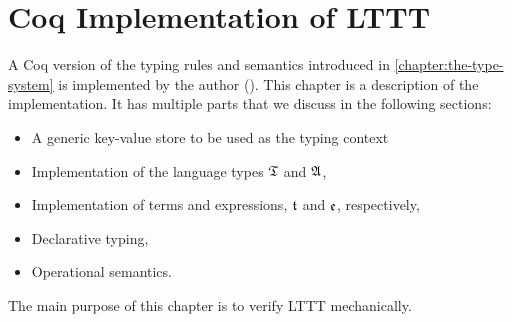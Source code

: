 \chapter{Coq Implementation of LTTT}\label{chap:coq-implementation}

A Coq version of the typing rules and semantics introduced in \ref{chapter:the-type-system} is implemented by the author (\cite{mohammad_ali_a_rabi_2021_4749276}). This chapter is a description of the implementation.
It has multiple parts that we discuss in the following sections:
\begin{itemize}
    \item A generic key-value store to be used as the typing context
    \item Implementation of the language types $\mathfrak{T}$ and $\mathfrak{A}$,
    \item Implementation of terms and expressions, $\mathfrak{t}$ and $\mathfrak{e}$, respectively,
    \item Declarative typing,
    \item Operational semantics.
\end{itemize}

The main purpose of this chapter is to verify LTTT mechanically.




